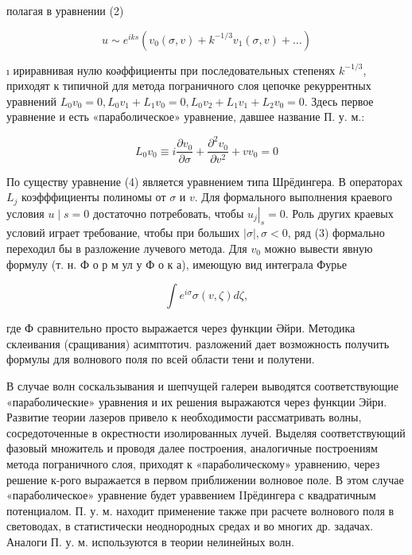 \documentclass[10pt]{article}
\begin{document}
полагая в уравнении (2)



\[

u \sim e^{i k s}\left(v_{0}(\sigma, v)+k^{-1 / 3} v_{1}(\sigma, v)+\ldots\right)

\]



ı ириравнивая нулю коәффициенты при последовательных степенях $k^{-1 / 3}$, приходят к типичной для метода пограничного слоя цепочке рекуррентных уравнений $L_{0} v_{0}=0, L_{0} v_{1}+L_{1} v_{0}=0, L_{0} v_{2}+L_{1} v_{1}+L_{2} v_{0}=0$. Здесь первое уравнение и есть «параболическое» уравнение, давшее название П. у. м.:



\[

L_{0} v_{0} \equiv i \frac{\partial v_{0}}{\partial \sigma}+\frac{\partial^{2} v_{0}}{\partial v^{2}}+v v_{0}=0

\]



По существу уравнение (4) является уравнением типа Шрёдингера. В операторах $L_{j}$ коэфффициенты полиномы от $\sigma$ и $v$. Для формального выполнения краевого условия $u \mid s=0$ достаточно потребовать, чтобы $\left.u_{j}\right|_{s}=0$. Роль других краевых условий играет требование, чтобы при больших $|\sigma|, \sigma<0$, ряд (3) формально переходил бы в разложение лучевого метода. Для $v_{0}$ можно вывести явную формулу (т. н. Ф о р м ул у Ф о к а), имеющую вид интеграла Фурье



\[

\int e^{i \sigma} \sigma(v, \zeta) d \zeta,

\]



где Ф сравнительно просто выражается через функции Әйри. Методика склеивания (сращивания) асимптотич. разложений дает возможность получить формулы для волнового поля по всей области тени и полутени.



В случае волн соскальзывания и шепчущей галереи выводятся соответствующие «параболические» уравнения и их решения выражаются через функции Эйри. Развитие теории лазеров привело к необходимости рассматривать волны, сосредоточенные в окрестности изолированных лучей. Выделяя соответствующий фазовый множитель и проводя далее построения, аналогичные построениям метода пограничного слоя, приходят к «параболическому» уравнению, через решение к-рого выражается в первом приближении волновое поле. В этом случае «параболическое» уравнение будет ураввением IIрёдингера с квадратичным потенциалом. П. у. м. находит применение также при расчете волнового поля в световодах, в статистически неоднородных средах и во многих др. задачах. Аналоги П. у. м. используются в теории нелинейных волн.
\end{document}
